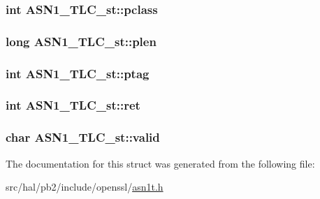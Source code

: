 \subsubsection[{\texorpdfstring{pclass}{pclass}}]{\setlength{\rightskip}{0pt plus 5cm}int A\+S\+N1\+\_\+\+T\+L\+C\+\_\+st\+::pclass}\hypertarget{struct_a_s_n1___t_l_c__st_a33e7ac01afc4ecad3cf6d6d6d8f929f5}{}\label{struct_a_s_n1___t_l_c__st_a33e7ac01afc4ecad3cf6d6d6d8f929f5}
\subsubsection[{\texorpdfstring{plen}{plen}}]{\setlength{\rightskip}{0pt plus 5cm}long A\+S\+N1\+\_\+\+T\+L\+C\+\_\+st\+::plen}\hypertarget{struct_a_s_n1___t_l_c__st_af587b734c7de4809c665bce45fc2b66a}{}\label{struct_a_s_n1___t_l_c__st_af587b734c7de4809c665bce45fc2b66a}
\subsubsection[{\texorpdfstring{ptag}{ptag}}]{\setlength{\rightskip}{0pt plus 5cm}int A\+S\+N1\+\_\+\+T\+L\+C\+\_\+st\+::ptag}\hypertarget{struct_a_s_n1___t_l_c__st_a58cd31917a573675361476d87346549a}{}\label{struct_a_s_n1___t_l_c__st_a58cd31917a573675361476d87346549a}
\subsubsection[{\texorpdfstring{ret}{ret}}]{\setlength{\rightskip}{0pt plus 5cm}int A\+S\+N1\+\_\+\+T\+L\+C\+\_\+st\+::ret}\hypertarget{struct_a_s_n1___t_l_c__st_afea043db523f6ea0ca08eb16668f4992}{}\label{struct_a_s_n1___t_l_c__st_afea043db523f6ea0ca08eb16668f4992}
\subsubsection[{\texorpdfstring{valid}{valid}}]{\setlength{\rightskip}{0pt plus 5cm}char A\+S\+N1\+\_\+\+T\+L\+C\+\_\+st\+::valid}\hypertarget{struct_a_s_n1___t_l_c__st_aae7c516be44ce4351b1d5666ac71ab32}{}\label{struct_a_s_n1___t_l_c__st_aae7c516be44ce4351b1d5666ac71ab32}


The documentation for this struct was generated from the following file\+:\begin{DoxyCompactItemize}
\item 
src/hal/pb2/include/openssl/\hyperlink{asn1t_8h}{asn1t.\+h}\end{DoxyCompactItemize}
